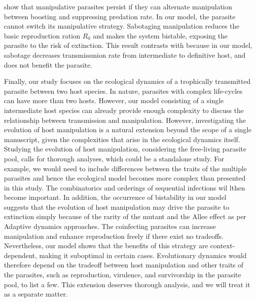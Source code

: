 \documentclass[a4paper]{scrartcl}
\begin{document}
\cite{Iritani2018} show that manipulative parasites persist if they can alternate manipulation between boosting and suppressing predation rate. 
In our model, the parasite cannot switch its manipulative strategy. 
Sabotaging manipulation reduces the basic reproduction ration $R_0$ and makes the system bistable, exposing the parasite to the risk of extinction. This result contrasts with \cite{Iritani2018} because in our model, sabotage decreases transmissmion rate from intermediate to definitive host, and does not benefit the parasite.

Finally, our study focuses on the ecological dynamics of a trophically transmitted parasite between two host species. 
In nature, parasites with complex life-cycles can have more than two hosts. 
However, our model consisting of a single intermediate host species can already provide enough complexity to discuss the relationship between transmission and manipulation.
However, investigating the evolution of host manipulation is a natural extension beyond the scope of a single manuscript, given the complexities that arise in the ecological dynamics itself.
Studying the evolution of host manipulation, considering the free-living parasite pool, calls for thorough analyses, which could be a standalone study. 
For example, we would need to include differences between the traits of the multiple parasites and hence the ecological model becomes more complex than presented in this study.
The combinatorics and orderings of sequential infections wil lthen become important.
In addition, the occurrence of bistability in our model suggests that the evolution of host manipulation may drive the parasite to extinction simply because of the rarity of the mutant and the Allee effect as per Adaptive dynamics approaches. 
The coinfecting parasites can increase manipulation and enhance reproduction freely if there exist no tradeoffs. 
Nevertheless, our model shows that the benefits of this strategy are context-dependent, making it suboptimal in certain cases. 
Evolutionary dynamics would therefore depend on the tradeoff between host manipulation and other traits of the parasites, such as reproduction, virulence, and survivorship in the parasite pool, to list a few. 
This extension deserves thorough analysis, and we will treat it as a separate matter.






\end{document}
